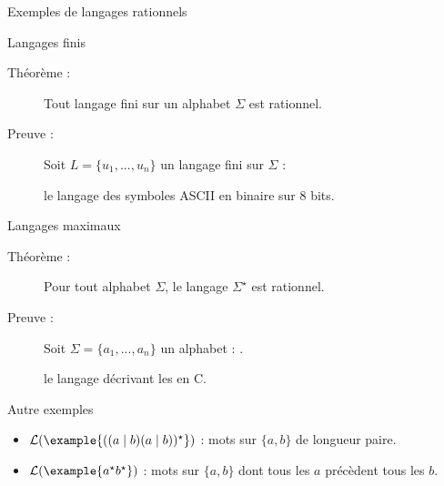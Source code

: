 
\begingroup

\begin{frame}{Exemples de langages rationnels}

  \begin{block}{Langages finis}
    \begin{description}
    \item[Théorème :]
      Tout \alert{langage fini} sur un alphabet $\Sigma$ est rationnel.
    \item[Preuve :]
      Soit $L = \{u_1, ..., u_n\}$ un langage fini sur $\Sigma$ :
    \item[] le langage  des symboles ASCII en binaire sur 8 bits.
    \end{description}
  \end{block}

  \begin{block}{Langages maximaux}
    \begin{description}
    \item[Théorème :]
      Pour tout alphabet $\Sigma$, le langage \alert{$\Sigma^\star$} est rationnel.
    \item[Preuve :]
      Soit $\Sigma = \{a_1, ..., a_n\}$ un alphabet : .
    \item[] le langage décrivant les  en C.
    \end{description}
  \end{block}

  \begin{block}{Autre exemples}
    \begin{itemize}
    \item $\mathcal{L}(\example{((a\mid b)(a\mid b))^\star})$ : mots sur $\{a, b\}$ de longueur paire.
    \item $\mathcal{L}(\example{a^\star b^\star})$ : mots sur $\{a, b\}$ dont tous les $a$ précèdent tous les $b$.
    \end{itemize}
  \end{block}
  
\end{frame}

\endgroup
